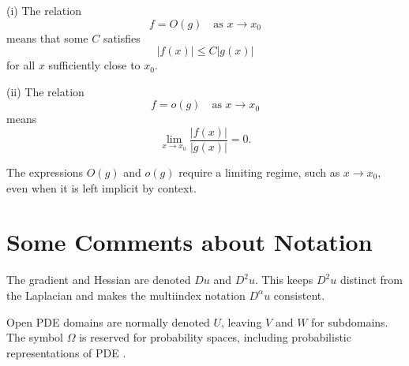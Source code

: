 \begin{definition}
\label{def:big-oh-little-oh-notation}
(i) The relation
\[
f=O(g)\quad\text{as }x\to x_0
\]
means that some $C$ satisfies
\[
|f(x)|\leq C|g(x)|
\]
for all $x$ sufficiently close to $x_0$.

(ii) The relation
\[
f=o(g)\quad\text{as }x\to x_0
\]
means
\[
\lim_{x\to x_0}\frac{|f(x)|}{|g(x)|}=0.
\]
\end{definition}

\begin{remark}
\label{rem:big-oh-little-oh-implicit-limit}
The expressions $O(g)$ and $o(g)$ require a limiting regime, such as $x\to x_0$, even when it is left implicit by context.
\end{remark}

\section{Some Comments about Notation}
\label{sec:comments-about-notation}

\begin{remark}
\label{rem:gradient-notation-choice-du}
The gradient and Hessian are denoted $Du$ and $D^2u$. This keeps $D^2u$ distinct from the Laplacian and makes the multiindex notation $D^\alpha u$ consistent.
\end{remark}

\begin{remark}
\label{rem:domain-notation-choice-u}
Open PDE domains are normally denoted $U$, leaving $V$ and $W$ for subdomains. The symbol $\Omega$ is reserved for probability spaces, including probabilistic representations of PDE \cite{Freidlin1985}.
\end{remark}
